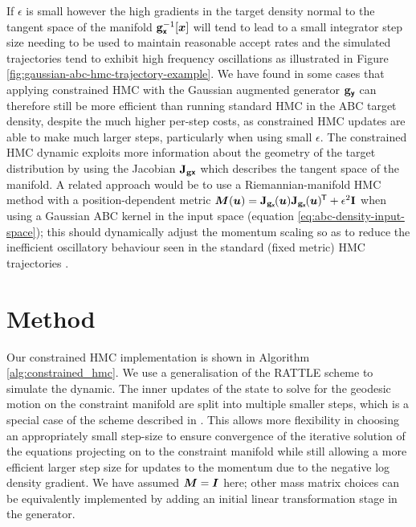 If $\epsilon$ is small however the high gradients in the target density normal to the tangent space of the manifold ${\mathbf{g}}_{\boldsymbol{\mathsf{x}}}^{-1}[\boldsymbol{x}]$ will tend to lead to a small integrator step size needing to be used to maintain reasonable accept rates and the simulated trajectories tend to exhibit high frequency oscillations as illustrated in Figure \ref{fig:gaussian-abc-hmc-trajectory-example}. We have found in some cases that applying constrained \ac{HMC} with the Gaussian augmented generator ${\mathbf{g}}_{\boldsymbol{\mathsf{y}}}$ can therefore still be more efficient than running standard \ac{HMC} in the \ac{ABC} target density, despite the much higher per-step costs, as constrained \ac{HMC} updates are able to make much larger steps, particularly when using small $\epsilon$. The constrained \ac{HMC} dynamic exploits more information about the geometry of the target distribution by using the Jacobian $\mathbf{J}_{{\mathbf{g}}{\boldsymbol{\mathsf{x}}}}$ which describes the tangent space of the manifold. A related approach would be to use a Riemannian-manifold \ac{HMC} \citep{girolami2011riemann} method with a position-dependent metric $\mtx{M}(\vct{u}) = \jacob{\genfunc_{\rvct{x}}}{\vct{u}}\jacob{\genfunc_{\rvct{x}}}{\vct{u}}\phantom{}\tr + \epsilon^2\mathbf{I}$ when using a Gaussian \ac{ABC} kernel in the input space (equation \eqref{eq:abc-density-input-space}); this should dynamically adjust the momentum scaling so as to reduce the inefficient oscillatory behaviour seen in the standard (fixed metric) \ac{HMC} trajectories \cite{betancourt2013general}.

\section{Method}\label{sec:method}

Our constrained \ac{HMC} implementation is shown in Algorithm \ref{alg:constrained_hmc}. We use a generalisation of the RATTLE scheme to simulate the dynamic. The inner updates of the state to solve for the geodesic motion on the constraint manifold are split into multiple smaller steps, which is a special case of the scheme described in \citep{leimkuhler2016efficient}. This allows more flexibility in choosing an appropriately small step-size to ensure convergence of the iterative solution of the equations projecting on to the constraint manifold while still allowing a more efficient larger step size for updates to the momentum due to the negative log density gradient. We have assumed $\boldsymbol{M} = \boldsymbol{I}$ here; other mass matrix choices can be equivalently implemented by adding an initial linear transformation stage in the generator.

